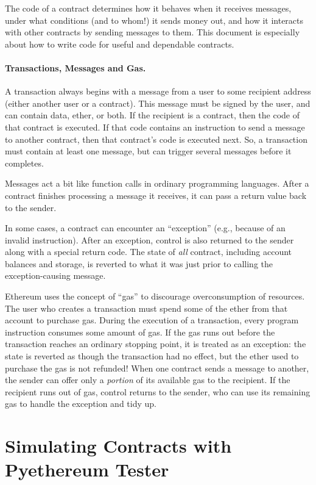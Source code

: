 \documentclass[12pt]{article}
\begin{document}
The code of a contract determines how it behaves when it receives messages, under what conditions (and to whom!) it sends  money out, and how it interacts with other contracts by sending messages to them. This document is especially about how to write code for useful and dependable contracts.

\paragraph{Transactions, Messages and Gas.}
A transaction always begins with a message from a user to some recipient address (either another user or a contract). This message must be signed by the user, and can contain data, ether, or both. If the recipient is a contract, then the code of that contract is executed. If that code contains an instruction to send a message to another contract, then that contract's code is executed next. So, a transaction must contain at least one message, but can trigger several messages before it completes.

Messages act a bit like function calls in ordinary programming languages. After a contract finishes processing a message it receives, it can pass a return value back to the sender.

In some cases, a contract can encounter an ``exception'' (e.g., because of an invalid instruction). After an exception, control is also returned to the sender along with a special return code. The state of \emph{all} contract, including account balances and storage, is reverted to what it was just prior to calling the exception-causing message.

Ethereum uses the concept of ``gas'' to discourage overconsumption of resources. The user who creates a transaction must spend some of the ether from that account to purchase gas. During the execution of a transaction, every program instruction consumes some amount of gas. If the gas runs out before the transaction reaches an ordinary stopping point, it is treated as an exception: the state is reverted as though the transaction had no effect, but the ether used to purchase the gas is not refunded! When one contract sends a message to another, the sender can offer only a \emph{portion} of its available gas to the recipient. If the recipient runs out of gas, control returns to the sender, who can use its remaining gas to handle the exception and tidy up.


\section{Simulating Contracts with Pyethereum Tester}
\end{document}
